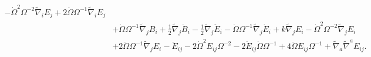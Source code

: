 \documentclass[10pt,letterpaper]{article}
\numberwithin{equation}{section}
\begin{document}
\begin{align}
 -  \dot{\Omega}^2 \Omega^{-2} \tilde\nabla_{i}E_{j}
 + 2 \ddot{\Omega} \Omega^{-1} \tilde\nabla_{i}E_{j}\nonumber\\
& + \dot{\Omega} \Omega^{-1} \tilde\nabla_{j}B_{i}
 + \tfrac{1}{2} \tilde\nabla_{j}\dot{B}_{i}
 -  \tfrac{1}{2} \tilde\nabla_{j}\ddot{E}_{i}
 -  \dot{\Omega} \Omega^{-1} \tilde\nabla_{j}\dot{E}_{i}
 + k \tilde\nabla_{j}E_{i}
 -  \dot{\Omega}^2 \Omega^{-2} \tilde\nabla_{j}E_{i}\nonumber\\
& + 2 \ddot{\Omega} \Omega^{-1} \tilde\nabla_{j}E_{i}
- \ddot{E}_{ij}
 - 2 \dot{\Omega}^2 E_{ij} \Omega^{-2}
 - 2 \dot{E}_{ij} \dot{\Omega} \Omega^{-1}
 + 4 \ddot{\Omega} E_{ij} \Omega^{-1}
 + \tilde\nabla_{a}\tilde\nabla^{a}E_{ij}.
\end{align}

\end{document}
